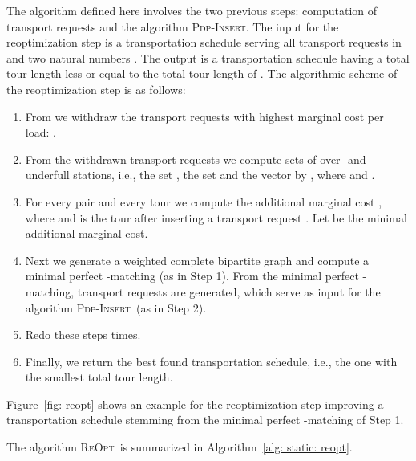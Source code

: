 \documentclass[english]{llncs}
\numberwithin{sublemma}{lemma}
\newcommand{\REOPT}{\textsc{ReOpt}\xspace}
\newcommand{\PDPINSERT}{\textsc{Pdp-Insert}\xspace}
\begin{document}
The algorithm defined here involves the two previous steps: computation of transport requests and the algorithm \PDPINSERT.
The input for the reoptimization step is a transportation schedule  serving all transport requests in  and two natural numbers .
The output is a transportation schedule having a total tour length less or equal to the total tour length of .
The algorithmic scheme of the reoptimization step is as follows:
\begin{enumerate}
 \item From  we withdraw the  transport requests with highest marginal cost per load: .
 \item From the withdrawn transport requests we compute sets of over- and underfull stations, i.e.,
       the set , the set  and the vector 
       by , where  and .
 \item For every pair  and every tour  we compute the additional marginal cost , where 
       and  is the tour after inserting a transport request .
       Let  be the minimal additional marginal cost.
 \item Next we generate a weighted complete bipartite graph  and compute a minimal perfect -matching (as in Step 1).
       From the minimal perfect -matching, transport requests are generated, which serve as input for the algorithm \PDPINSERT\ (as in Step 2).
 \item Redo these steps  times.
 \item Finally, we return the best found transportation schedule, i.e., the one with the smallest total tour length.
\end{enumerate}



Figure~\ref{fig: reopt} shows an example for the reoptimization step improving a transportation schedule stemming from the minimal perfect -matching of Step 1.


The algorithm \REOPT\ is summarized in Algorithm~\ref{alg: static: reopt}.
\end{document}
